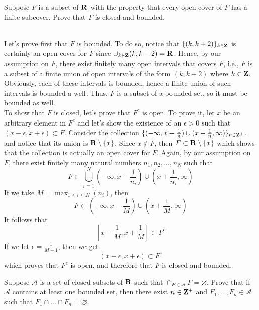\begin{exercise}
    Suppose $F$ is a subset of $\mathbf{R}$ with the property that every open cover of $F$ has a finite subcover. Prove that $F$ is closed and bounded. \\
\end{exercise}

\begin{solution}
    \\ Let's prove first that $F$ is bounded. To do so, notice that $\{(k, k+2)\}_{k \in \mathbf{Z}}$ is certainly an open cover for $F$ since $\cup_{k \in \mathbf{Z}}(k, k+2) = \mathbf{R}$. Hence, by our assumption on $F$, there exist finitely many open intervals that covers $F$, i.e., $F$ is a subset of a finite union of open intervals of the form $(k, k+2)$ where $k \in \mathbf{Z}$. Obviously, each of these intervals is bounded, hence a finite union of such intervals is bounded a well. Thus, $F$ is a subset of a bounded set, so it must be bounded as well. \\
    To show that $F$ is closed, let's prove that $F^c$ is open. To prove it, let $x$ be an arbitrary element in $F^c$ and let's show the existence of an $\epsilon > 0$ such that $(x - \epsilon, x + \epsilon) \subset F$. Consider the collection $\{(-\infty, x - \frac{1}{n})\cup (x + \frac{1}{n}, \infty)\}_{n\in\mathbf{Z}^+}$. and notice that its union is $\mathbf{R} \setminus \{x\}$. Since $x \notin F$, then $F \subset \mathbf{R} \setminus \{x\}$ which shows that the collection is actually an open cover for $F$. Again, by our assumption on $F$, there exist finitely many natural numbers $n_1, n_2, ..., n_N$ such that
    $$F \subset \bigcup_{i=1}^N \left(-\infty, x - \frac{1}{n_i} \right)\cup \left(x + \frac{1}{n_i}, \infty \right)$$
    If we take $M = \max_{1\leq i \leq N}(n_i)$, then
    $$F \subset \left(-\infty, x - \frac{1}{M} \right)\cup \left( x + \frac{1}{M}, \infty \right)$$
    It follows that
    $$\left[x - \frac{1}{M}, x + \frac{1}{M}\right] \subset F^c$$
    If we let $\epsilon =  \frac{1}{M+1}$, then we get
    $$(x - \epsilon, x+\epsilon) \subset F^c$$
    which proves that $F^c$ is open, and therefore that $F$ is closed and bounded. \\
\end{solution}

\begin{exercise}
    Suppose $\mathcal{A}$ is a set of closed subsets of $\mathbf{R}$ such that $\cap_{F\in\mathcal{A}}F = \varnothing$. Prove that if $\mathcal{A}$ contains at least one bounded set, then there exist $n \in \mathbf{Z}^+$ and $F_1, ..., F_n \in \mathcal{A}$ such that $F_1\cap ...\cap F_n = \varnothing$. \\
\end{exercise}

